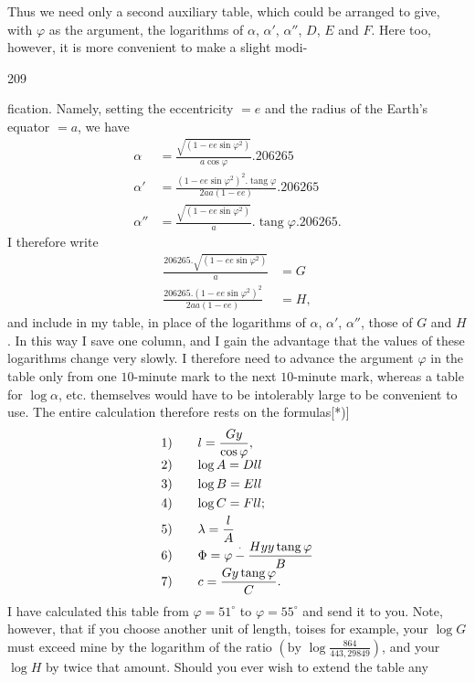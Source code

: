Thus we need only a second auxiliary table, which could be arranged to give, with $\varphi$ as the argument, the logarithms of $\alpha$, $\alpha'$, $\alpha''$, $D$, $E$ and $F$. Here too, however, it is more convenient to make a slight modi-\par
\clearpage
{}\hfill209\par\medskip
\noindent fication. Namely, setting the eccentricity $=e$ and the radius of the Earth's equator $=a$, we have
\[
\begin{aligned}
\alpha&=\frac{\sqrt{(1-ee\sin\varphi^2)}}{a\cos\varphi}.206265\\
\alpha'&=\frac{(1-ee\sin\varphi^2)^2.\operatorname{tang}\varphi}{2aa(1-ee)}.206265\\
\alpha''&=\frac{\sqrt{(1-ee\sin\varphi^2)}}a.\operatorname{tang}\varphi.206265.
\end{aligned}
\]
I therefore write
\[
\begin{aligned}
\frac{206265.\sqrt{(1-ee\sin\varphi^2)}}a&=G\\
\frac{206265.(1-ee\sin\varphi^2)^2}{2aa(1-ee)}&=H,
\end{aligned}
\]
and include in my table, in place of the logarithms of $\alpha$, $\alpha'$, $\alpha''$, those of $G$ and $H$. In this way I save one column, and I gain the advantage that the values of these logarithms change very slowly. I therefore need to advance the argument $\varphi$ in the table only from one $10$-minute mark to the next $10$-minute mark, whereas a table for $\log\alpha$, etc. themselves would have to be intolerably large to be convenient to use. The entire calculation therefore rests on the formulas[*)]
\[
\begin{array}{r@{\qquad}l}
1)&\displaystyle l=\frac{Gy}{\cos\varphi},\\[3pt]
2)&\log A=Dll\\[3pt]
3)&\log B=Ell\\[3pt]
4)&\log C=Fll;\\[3pt]
5)&\displaystyle\lambda=\frac lA\\[3pt]
6)&\displaystyle\Phi=\varphi\mathbin{\overset{\raisebox{.15ex}{\scriptsize.}}{-}}\frac{Hyy\operatorname{tang}\varphi}{B}\\[3pt]
7)&\displaystyle c=\frac{Gy\operatorname{tang}\varphi}{C}.
\end{array}
\]
I have calculated this table from $\varphi=51^\circ$ to $\varphi=55^\circ$ and send it to you. Note, however, that if you choose another unit of length, toises for example, your $\log G$ must exceed mine by the logarithm of the ratio $\left(\text{by }\log\frac{864}{443{,}29849}\right)$, and your $\log H$ by twice that amount. Should you ever wish to extend the table any
